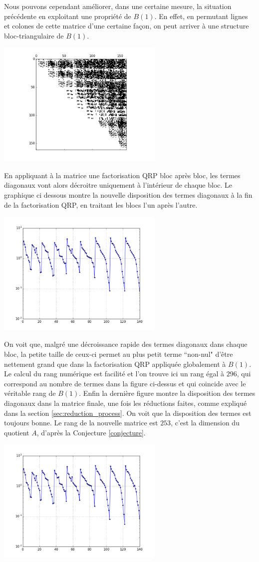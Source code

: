\documentclass{standalone}
\begin{document}
Nous pouvons cependant améliorer, dans une certaine mesure, la situation précédente en exploitant une propriété de $B(1)$. En effet, en permutant lignes et colones de cette matrice d'une certaine façon, on peut arriver à une structure bloc-triangulaire de $B(1)$.
\begin{center}
\includegraphics[width=8cm]{../png/beztri.png}
\end{center}
En appliquant à la matrice une factorisation QRP bloc après bloc, les termes diagonaux vont alors décroitre uniquement à l'intérieur de chaque bloc. Le graphique ci dessous montre la nouvelle disposition des termes diagonaux à la fin de la factorisation QRP, en traitant les blocs l'un après l'autre.
\begin{center}
\includegraphics[width=8cm]{../png/diag_beztri.png}
\end{center}
On voit que, malgré une décroissance rapide des termes diagonaux dans chaque bloc, la petite taille de ceux-ci permet au plus petit terme ``non-nul" d'être nettement grand que dans la factorisation QRP appliquée globalement à $B(1)$. Le calcul du rang numérique est facilité et l'on trouve ici un rang égal à $296$, qui correspond au nombre de termes dans la figure ci-dessus et qui coincide avec le véritable rang de $B(1)$.
Enfin la dernière figure montre la disposition des termes diagonaux dans la matrice finale, une fois les réductions faites, comme expliqué dans la section \ref{sec:reduction_process}. On voit que la disposition des termes est toujours bonne.
 Le rang de la nouvelle matrice est $253$, c'est la dimension du quotient $A$, d'après la Conjecture \ref{conjecture}.
\begin{center}
\includegraphics[width=8cm]{../png/diag_beztri_final.png}
\end{center}
\end{document}
